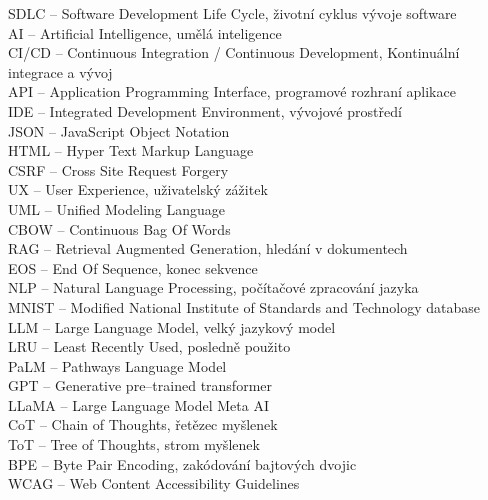\documentclass[FM,DP]{tulthesis}
\begin{document}
		\clearpage
		
		\tableofcontents
		
		\clearpage
		
		\begin{abbrList}
			SDLC – Software Development Life Cycle, životní cyklus vývoje software \\
			AI – Artificial Intelligence, umělá inteligence \\
			CI/CD – Continuous Integration / Continuous Development, Kontinuální integrace a vývoj \\
			API – Application Programming Interface, programové rozhraní aplikace \\
			IDE – Integrated Development Environment, vývojové prostředí \\
			JSON – JavaScript Object Notation \\
			HTML – Hyper Text Markup Language \\
			CSRF – Cross Site Request Forgery \\
			UX – User Experience, uživatelský zážitek \\
			UML – Unified Modeling Language \\
			CBOW – Continuous Bag Of Words \\
			RAG – Retrieval Augmented Generation, hledání v dokumentech \\
			EOS – End Of Sequence, konec sekvence \\
			NLP – Natural Language Processing, počítačové zpracování jazyka \\
			MNIST – Modified National Institute of Standards and Technology database \\
			LLM – Large Language Model, velký jazykový model \\
			LRU – Least Recently Used, posledně použito \\
			PaLM – Pathways Language Model \\
			GPT – Generative pre–trained transformer \\
			LLaMA – Large Language Model Meta AI \\
			CoT – Chain of Thoughts, řetězec myšlenek \\
			ToT – Tree of Thoughts, strom myšlenek \\
			BPE – Byte Pair Encoding, zakódování bajtových dvojic \\
			WCAG – Web Content Accessibility Guidelines \\
		\end{abbrList}
		
		
		
\end{document}

